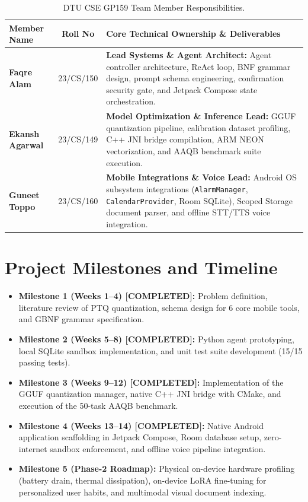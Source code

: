 \documentclass[12pt,a4paper,oneside]{report}
\begin{document}
\begin{table}[H]
\centering
\caption{DTU CSE GP159 Team Member Responsibilities.}
\label{tab:team}
\begin{tabularx}{\textwidth}{l c X}
\toprule
\textbf{Member Name} & \textbf{Roll No} & \textbf{Core Technical Ownership \& Deliverables} \\
\midrule
\textbf{Faqre Alam} & 23/CS/150 & \textbf{Lead Systems \& Agent Architect:} Agent controller architecture, ReAct loop, BNF grammar design, prompt schema engineering, confirmation security gate, and Jetpack Compose state orchestration. \\
\addlinespace
\textbf{Ekansh Agarwal} & 23/CS/149 & \textbf{Model Optimization \& Inference Lead:} GGUF quantization pipeline, calibration dataset profiling, C++ JNI bridge compilation, ARM NEON vectorization, and AAQB benchmark suite execution. \\
\addlinespace
\textbf{Guneet Toppo} & 23/CS/160 & \textbf{Mobile Integrations \& Voice Lead:} Android OS subsystem integrations (\texttt{AlarmManager}, \texttt{CalendarProvider}, Room SQLite), Scoped Storage document parser, and offline STT/TTS voice integration. \\
\bottomrule
\end{tabularx}
\end{table}

\section{Project Milestones and Timeline}
\begin{itemize}
    \item \textbf{Milestone 1 (Weeks 1--4) [COMPLETED]:} Problem definition, literature review of PTQ quantization, schema design for 6 core mobile tools, and GBNF grammar specification.
    \item \textbf{Milestone 2 (Weeks 5--8) [COMPLETED]:} Python agent prototyping, local SQLite sandbox implementation, and unit test suite development (15/15 passing tests).
    \item \textbf{Milestone 3 (Weeks 9--12) [COMPLETED]:} Implementation of the GGUF quantization manager, native C++ JNI bridge with CMake, and execution of the 50-task AAQB benchmark.
    \item \textbf{Milestone 4 (Weeks 13--14) [COMPLETED]:} Native Android application scaffolding in Jetpack Compose, Room database setup, zero-internet sandbox enforcement, and offline voice pipeline integration.
    \item \textbf{Milestone 5 (Phase-2 Roadmap):} Physical on-device hardware profiling (battery drain, thermal dissipation), on-device LoRA fine-tuning for personalized user habits, and multimodal visual document indexing.
\end{itemize}
\end{document}
